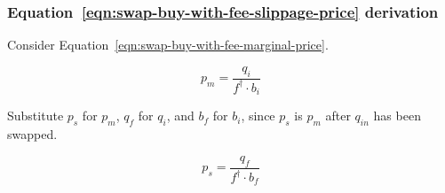 \subsubsection{Equation~\ref{eqn:swap-buy-with-fee-slippage-price} derivation}%
\label{sssec:equation-eqn-swap-buy-with-fee-slippage-price-derivation}

Consider Equation~\ref{eqn:swap-buy-with-fee-marginal-price}.

\begin{equation*}
	p_m = \frac{q_i}{f^{\dagger} \cdot b_i}
\end{equation*}

Substitute $p_s$ for $p_m$, $q_f$ for $q_i$, and $b_f$ for $b_i$, since $p_s$ is $p_m$
after $q_{in}$ has been swapped.

\begin{equation*}
	p_s = \frac{q_f}{f^{\dagger} \cdot b_f}
\end{equation*}
